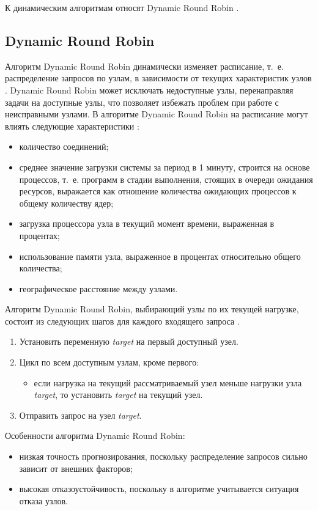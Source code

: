 К динамическим алгоритмам относят Dynamic Round Robin \cite{drr, dll_warsh}.

\subsection{Dynamic Round Robin}

Алгоритм Dynamic Round Robin динамически изменяет расписание, т.~е. распределение запросов по узлам, в зависимости от текущих характеристик узлов \cite{drr}. Dynamic Round Robin может исключать недоступные узлы, перенаправляя задачи на доступные узлы, что позволяет избежать проблем при работе с неисправными узлами. 
В алгоритме Dynamic Round Robin на расписание могут влиять следующие характеристики \cite{dll_warsh, com_analysis, part_algos}: 
\begin{itemize}
	\item количество соединений;
	\item среднее значение загрузки системы за период в 1 минуту, строится на основе процессов, т.~е. программ в стадии выполнения, стоящих в очереди ожидания ресурсов, выражается как отношение количества ожидающих процессов к общему количеству ядер;
	\item загрузка процессора узла в текущий момент времени, выраженная в процентах;
	\item использование памяти узла, выраженное в процентах относительно общего количества;
	\item географическое расстояние между узлами.
\end{itemize}
Алгоритм Dynamic Round Robin, выбирающий узлы по их текущей нагрузке, состоит из следующих шагов для каждого входящего запроса  \cite{com_analysis}.
\begin{enumerate}
	\item Установить переменную \textit{target} на первый доступный узел.
	\item Цикл по всем доступным узлам, кроме первого:
	 \begin{itemize}
	 	\item если нагрузка на текущий рассматриваемый узел меньше нагрузки узла \textit{target}, то установить \textit{target} на текущий узел.
	 \end{itemize}
	\item Отправить запрос на узел \textit{target}.
\end{enumerate}

Особенности алгоритма Dynamic Round Robin:
\begin{itemize}
	\item низкая точность прогнозирования, поскольку распределение запросов сильно зависит от внешних факторов;
	\item высокая отказоустойчивость, поскольку в алгоритме учитывается ситуация отказа узлов.
\end{itemize}

